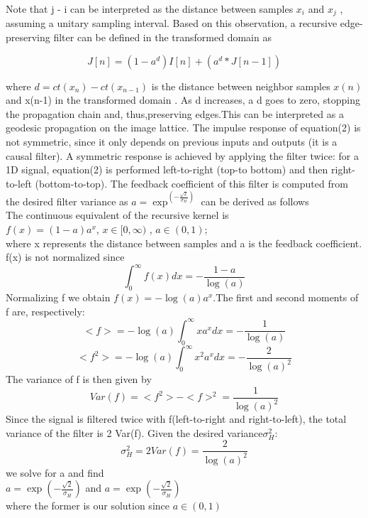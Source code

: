\documentclass[conference]{IEEEtran}
\begin{document}
Note that j - i can be interpreted as the distance between samples $x_i$ and $x_j$ , 
assuming a unitary sampling interval. Based on this observation, a recursive edge-preserving filter can be defined in the transformed domain as 

$$J[n] = (1 - a^d ) I[n] + (a^d *J[n - 1]) $$

where $d = ct(x_n) - ct(x_{n-1})$ is the distance between neighbor samples $x(n)$ and x(n-1) in the transformed domain . As d increases, a d goes to zero, stopping the propagation chain and, thus,preserving edges.This can be interpreted as a geodesic propagation on the image lattice. The impulse response of equation(2) is not symmetric, since it only depends on previous inputs and outputs (it is a causal filter). A symmetric response is achieved by applying the filter twice: for a 1D signal, equation(2) is performed left-to-right (top-to bottom) and then right-to-left (bottom-to-top). The feedback coefficient of this filter is computed from the desired filter variance as $a = \exp^{(-\frac{ \sqrt{2}}{\sigma_H})}$ can be derived as follows
\\
The continuous equivalent of the recursive kernel is \\
$f(x) = (1-a)a^x$, $x \in [0,\infty)$ , $ a\in (0,1)$;\\
where x represents the distance between samples and a is the feedback coefficient. f(x) is not normalized since\\
$$\int_0^\infty f(x)dx = - \frac{1-a}{\log(a)}$$
Normalizing f we obtain $f(x) = -\log(a)a^x$.The first and second moments of f are, respectively:
$$<f> = -\log(a) \int_0^\infty xa^xdx = -\frac{1}{\log(a)}$$
$$<f^2> = -\log(a) \int_0^\infty x^2a^xdx = -\frac{2}{\log(a)^2}$$
The variance of f is then given by 
$$Var(f) = <f^2>-<f>^2 = \frac{1}{\log(a)^2}$$
Since the signal is filtered twice with f(left-to-right and right-to-left), the total variance of the filter is 2 Var(f). Given the desired variance$\sigma_H^2$:
$$\sigma_H^2 = 2Var(f) = \frac{2}{\log(a)^2}$$
we solve for a and find \\
$a = \exp(-\frac{\sqrt{2}}{\sigma_H})$ and $a = \exp(-\frac{\sqrt{2}}{\sigma_H})$\\
where the former is our solution since $a \in (0,1)$
\end{document}
